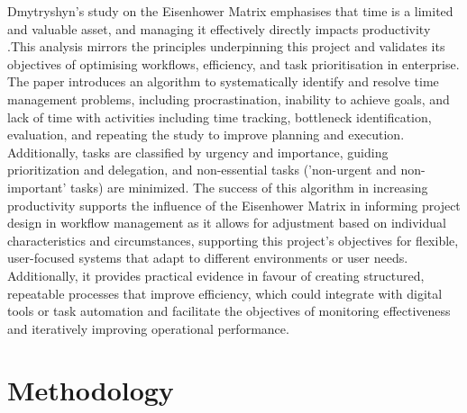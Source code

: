 \documentclass{report}
\begin{document}
Dmytryshyn's study on the Eisenhower Matrix emphasises that time is a limited and valuable asset, and managing it effectively directly impacts productivity \parencite{dmytryshynProposalEffectiveTime2022}.This analysis mirrors the principles underpinning this project and validates its objectives of optimising workflows, efficiency, and task prioritisation in enterprise. The paper introduces an algorithm to systematically identify and resolve time management problems, including procrastination, inability to achieve goals, and lack of time with activities including time tracking, bottleneck identification, evaluation, and repeating the study to improve planning and execution.  Additionally, tasks are classified by urgency and importance, guiding prioritization and delegation, and non-essential tasks ('non-urgent and non-important' tasks) are minimized. The success of this algorithm in increasing productivity supports the influence of the Eisenhower Matrix in informing project design in workflow management as it allows for adjustment based on individual characteristics and circumstances, supporting this project's objectives for flexible, user-focused systems that adapt to different environments or user needs. Additionally, it provides practical evidence in favour of creating structured, repeatable processes that improve efficiency, which could integrate with digital tools or task automation and facilitate the objectives of  monitoring effectiveness and iteratively improving operational performance.


\chapter{Methodology}  %
\end{document}
